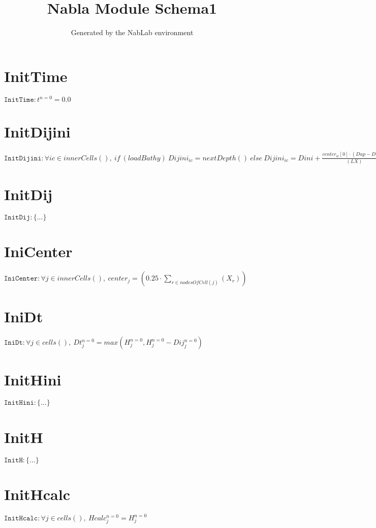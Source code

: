 \documentclass[11pt]{article}
\title{Nabla Module Schema1}
\author{Generated by the NabLab environment}
\begin{document}
\maketitle


\section{InitTime}
$\texttt{InitTime} : t^{n=0} = 0.0$


\section{InitDijini}
$\texttt{InitDijini} : \forall{ic\in innerCells()}, \ if~\left(loadBathy\right)~Dijini_{ic} = nextDepth\left(\right)~else~Dijini_{ic} = Dini + \frac{center_{ic}\left[0\right] \cdot (Dup - Dini)}{(LX)}$


\section{InitDij}
$\texttt{InitDij} : \{ ... \}$


\section{IniCenter}
$\texttt{IniCenter} : \forall{j\in innerCells()}, \ center_{j} = (0.25 \cdot \sum_{r\in nodesOfCell(j)}\left(X_{r}\right))$


\section{IniDt}
$\texttt{IniDt} : \forall{j\in cells()}, \ Dt^{n=0}_{j} = max\left(H^{n=0}_{j},H^{n=0}_{j} - Dij^{n=0}_{j}\right)$


\section{InitHini}
$\texttt{InitHini} : \{ ... \}$


\section{InitH}
$\texttt{InitH} : \{ ... \}$


\section{InitHcalc}
$\texttt{InitHcalc} : \forall{j\in cells()}, \ Hcalc^{n=0}_{j} = H^{n=0}_{j}$
\end{document}
